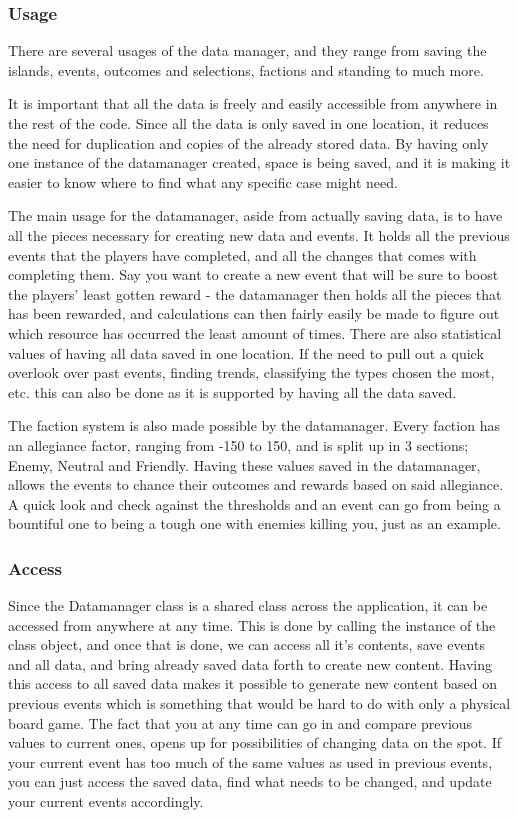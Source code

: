 \subsubsection{Usage}

There are several usages of the data manager, and they range from saving the islands, events, outcomes and selections, factions and standing to much more.

It is important that all the data is freely and easily accessible from anywhere in the rest of the code. Since all the data is only saved in one location, it reduces the need for duplication and copies of the already stored data. By having only one instance of the datamanager created, space is being saved, and it is making it easier to know where to find what any specific case might need.

The main usage for the datamanager, aside from actually saving data, is to have all the pieces necessary for creating new data and events. It holds all the previous events that the players have completed, and all the changes that comes with completing them. Say you want to create a new event that will be sure to boost the players' least gotten reward - the datamanager then holds all the pieces that has been rewarded, and calculations can then fairly easily be made to figure out which resource has occurred the least amount of times.
There are also statistical values of having all data saved in one location. If the need to pull out a quick overlook over past events, finding trends, classifying the types chosen the most, etc. this can also be done as it is supported by having all the data saved.

The faction system is also made possible by the datamanager. Every faction has an allegiance factor, ranging from -150 to 150, and is split up in 3 sections; Enemy, Neutral and Friendly. Having these values saved in the datamanager, allows the events to chance their outcomes and rewards based on said allegiance. A quick look and check against the thresholds and an event can go from being a bountiful one to being a tough one with enemies killing you, just as an example.


\subsubsection{Access}
Since the Datamanager class is a shared class across the application, it can be accessed from anywhere at any time. This is done by calling the instance of the class object, and once that is done, we can access all it's contents, save events and all data, and bring already saved data forth to create new content. Having this access to all saved data makes it possible to generate new content based on previous events which is something that would be hard to do with only a physical board game. 
The fact that you at any time can go in and compare previous values to current ones, opens up for possibilities of changing data on the spot. If your current event has too much of the same values as used in previous events, you can just access the saved data, find what needs to be changed, and update your current events accordingly.	


